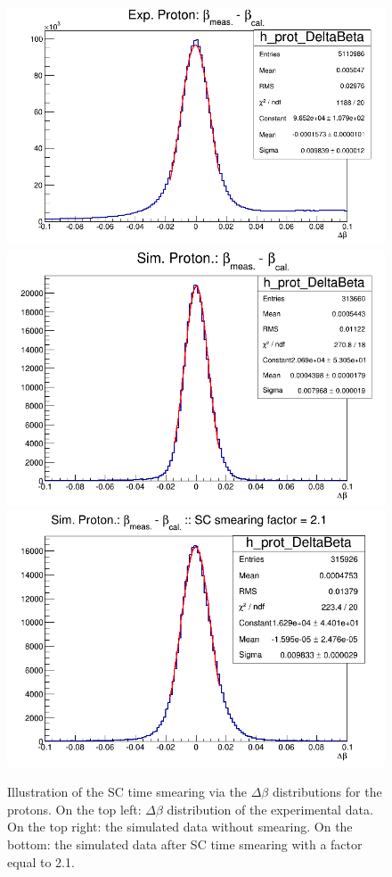 \begin{figure}[tbp]
\hspace{-0.7in}
\includegraphics[scale=0.3]{fig_simulation/Exp_proton_delta_beta.png}
\hspace{-0.1in}
\includegraphics[scale=0.32]{fig_simulation/Sim_proton_delta_beta.png}
\centering
\includegraphics[scale=0.32]{fig_simulation/Sim_proton_delta_beta_smeared.png}
\caption{Illustration of the SC time smearing via the $\Delta \beta$ distributions for the protons. On the top left: $\Delta \beta$ distribution of the experimental data. On the top right: the simulated data without smearing. On the bottom: the simulated data after SC time smearing with a factor equal to 2.1.} 
\label{fig:SC_smearing_factors}
\end{figure}

